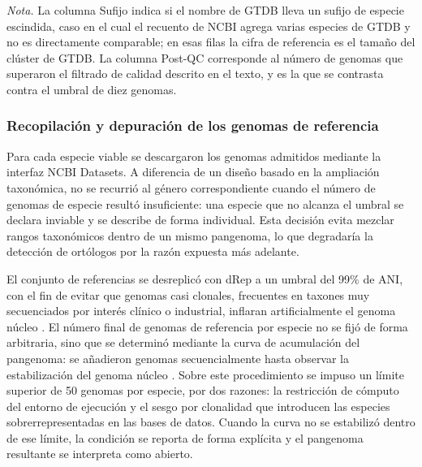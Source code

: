 \begin{table}[H]
\centering
\footnotesize
\setlength{\tabcolsep}{3pt}
\caption{Viabilidad de cada especie para el análisis pangenómico según disponibilidad genómica pública.}
\label{tab:viabilidad}

\vspace{0.5em}
\begin{minipage}{0.95\textwidth}
\footnotesize
\textit{Nota.} La columna Sufijo indica si el nombre de GTDB lleva un sufijo de especie escindida, caso en el cual el recuento de NCBI agrega varias especies de GTDB y no es directamente comparable; en esas filas la cifra de referencia es el tamaño del clúster de GTDB. La columna Post-QC corresponde al número de genomas que superaron el filtrado de calidad descrito en el texto, y es la que se contrasta contra el umbral de diez genomas.
\end{minipage}
\end{table}

\subsubsection{Recopilación y depuración de los genomas de referencia}

Para cada especie viable se descargaron los genomas admitidos mediante la interfaz NCBI Datasets. A diferencia de un diseño basado en la ampliación taxonómica, no se recurrió al género correspondiente cuando el número de genomas de especie resultó insuficiente: una especie que no alcanza el umbral se declara inviable y se describe de forma individual. Esta decisión evita mezclar rangos taxonómicos dentro de un mismo pangenoma, lo que degradaría la detección de ortólogos por la razón expuesta más adelante.

El conjunto de referencias se desreplicó con dRep a un umbral del 99\% de ANI, con el fin de evitar que genomas casi clonales, frecuentes en taxones muy secuenciados por interés clínico o industrial, inflaran artificialmente el genoma núcleo \cite{olm2017}. El número final de genomas de referencia por especie no se fijó de forma arbitraria, sino que se determinó mediante la curva de acumulación del pangenoma: se añadieron genomas secuencialmente hasta observar la estabilización del genoma núcleo \cite{tettelin2005}. Sobre este procedimiento se impuso un límite superior de 50 genomas por especie, por dos razones: la restricción de cómputo del entorno de ejecución y el sesgo por clonalidad que introducen las especies sobrerrepresentadas en las bases de datos. Cuando la curva no se estabilizó dentro de ese límite, la condición se reporta de forma explícita y el pangenoma resultante se interpreta como abierto.

